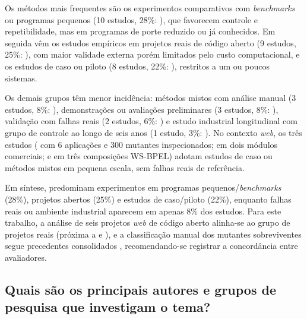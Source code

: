 Os métodos mais frequentes são os experimentos comparativos com \textit{benchmarks} ou programas pequenos (10 estudos, 28\%: \cite{shomali2020, arasteh2022, arasteh2023, kurtz2016, zhang2010, kuroishi2020, kintis2010, lin2018, tao2025, nica2011}), que favorecem controle e repetibilidade, mas em programas de porte reduzido ou já conhecidos. Em seguida vêm os estudos empíricos em projetos reais de código aberto (9 estudos, 25\%: \cite{zhang2019, zhang2022, ashong2025, ashong2026, guizzo2022, ahmed2016, ojdanic2023, alenezi2016}), com maior validade externa porém limitados pelo custo computacional, e os estudos de caso ou piloto (8 estudos, 22\%: \cite{just2012, jalbert2012, belli2011, esterobotaro2010, assylbekov2013, inozemtseva2013, chauhan2015, he2024}), restritos a um ou poucos sistemas.

Os demais grupos têm menor incidência: métodos mistos com análise manual (3 estudos, 8\%: \cite{yao2014, yandrapally2021, guerino2024}), demonstrações ou avaliações preliminares (3 estudos, 8\%: \cite{tufano2020, dimov2010, grano2019}), validação com falhas reais (2 estudos, 6\%: \cite{just2014, khanfir2023}) e estudo industrial longitudinal com grupo de controle ao longo de seis anos (1 estudo, 3\%: \cite{petrovic2021}). No contexto \textit{web}, os três estudos ( com 6 aplicações e 300 mutantes inspecionados;  em dois módulos comerciais; e  em três composições WS-BPEL) adotam estudos de caso ou métodos mistos em pequena escala, sem falhas reais de referência.

Em síntese, predominam experimentos em programas pequenos/\textit{benchmarks} (28\%), projetos abertos (25\%) e estudos de caso/piloto (22\%), enquanto falhas reais ou ambiente industrial aparecem em apenas 8\% dos estudos. Para este trabalho, a análise de seis projetos \textit{web} de código aberto alinha-se ao grupo de projetos reais (próxima a  e ), e a classificação manual dos mutantes sobreviventes segue precedentes consolidados \cite{yao2014, yandrapally2021, guerino2024}, recomendando-se registrar a concordância entre avaliadores.

\subsection{Quais são os principais autores e grupos de pesquisa que investigam o tema?}
\label{subsec:autores-grupos}

